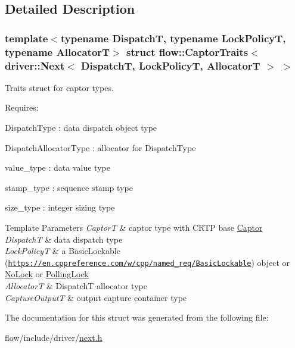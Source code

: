 \subsection{Detailed Description}
\subsubsection*{template$<$typename DispatchT, typename Lock\+PolicyT, typename AllocatorT$>$\newline
struct flow\+::\+Captor\+Traits$<$ driver\+::\+Next$<$ Dispatch\+T, Lock\+Policy\+T, Allocator\+T $>$ $>$}

Traits struct for captor types. 

Requires\+:
\begin{DoxyItemize}
\item {\ttfamily Dispatch\+Type} \+: data dispatch object type
\item {\ttfamily Dispatch\+Allocator\+Type} \+: allocator for {\ttfamily Dispatch\+Type}
\item {\ttfamily value\+\_\+type} \+: data value type
\item {\ttfamily stamp\+\_\+type} \+: sequence stamp type
\item {\ttfamily size\+\_\+type} \+: integer sizing type
\end{DoxyItemize}


\begin{DoxyTemplParams}{Template Parameters}
{\em CaptorT} & captor type with C\+R\+TP base {\ttfamily \hyperlink{classflow_1_1_captor}{Captor}}\\
\hline
{\em DispatchT} & data dispatch type \\
\hline
{\em Lock\+PolicyT} & a Basic\+Lockable (\href{https://en.cppreference.com/w/cpp/named_req/BasicLockable}{\tt https\+://en.\+cppreference.\+com/w/cpp/named\+\_\+req/\+Basic\+Lockable}) object or \hyperlink{structflow_1_1_no_lock}{No\+Lock} or \hyperlink{structflow_1_1_polling_lock}{Polling\+Lock} \\
\hline
{\em AllocatorT} & {\ttfamily DispatchT} allocator type \\
\hline
{\em Capture\+OutputT} & output capture container type \\
\hline
\end{DoxyTemplParams}


The documentation for this struct was generated from the following file\+:\begin{DoxyCompactItemize}
\item 
flow/include/driver/\hyperlink{next_8h}{next.\+h}\end{DoxyCompactItemize}
